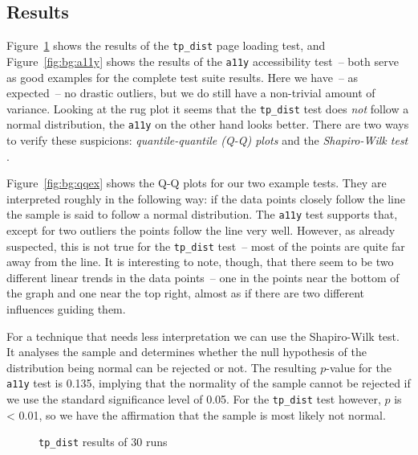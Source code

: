 \subsection{Results} %
\label{sec:bg:results}

Figure~\ref{fig:bg:tpdist} shows the results of the \texttt{tp\_dist} page
loading test, and Figure~\ref{fig:bg:a11y} shows the results of the
\texttt{a11y} accessibility test~-- both serve as good examples for the
complete test suite results. Here we have~-- as expected~-- no drastic
outliers, but we do still have a non-trivial amount of variance. Looking at
the rug plot it seems that the \texttt{tp\_dist} test does \emph{not} follow a
normal distribution, the \texttt{a11y} on the other hand looks better. There
are two ways to verify these suspicions: \emph{quantile-quantile (Q-Q) plots}
and the \emph{Shapiro-Wilk test} \citep{shapiro_analysis_1965}.

Figure~\ref{fig:bg:qqex} shows the Q-Q plots for our two example tests. They
are interpreted roughly in the following way: if the data points closely
follow the line the sample is said to follow a normal distribution. The
\texttt{a11y} test supports that, except for two outliers the points follow
the line very well. However, as already suspected, this is not true for the
\texttt{tp\_dist} test~-- most of the points are quite far away from the line.
It is interesting to note, though, that there seem to be two different linear
trends in the data points~-- one in the points near the bottom of the graph
and one near the top right, almost as if there are two different influences
guiding them.

For a technique that needs less interpretation we can use the Shapiro-Wilk
test. It analyses the sample and determines whether the null hypothesis of the
distribution being normal can be rejected or not. The resulting $p$-value for
the \texttt{a11y} test is 0.135, implying that the normality of the sample
cannot be rejected if we use the standard significance level of 0.05. For the
\texttt{tp\_dist} test however, $p$ is < 0.01, so we have the affirmation that
the sample is most likely not normal.

\begin{figure}[tpb]
    \centering
    
    \caption{\texttt{tp\_dist} results of 30 runs}
    \label{fig:bg:tpdist}
\end{figure}

